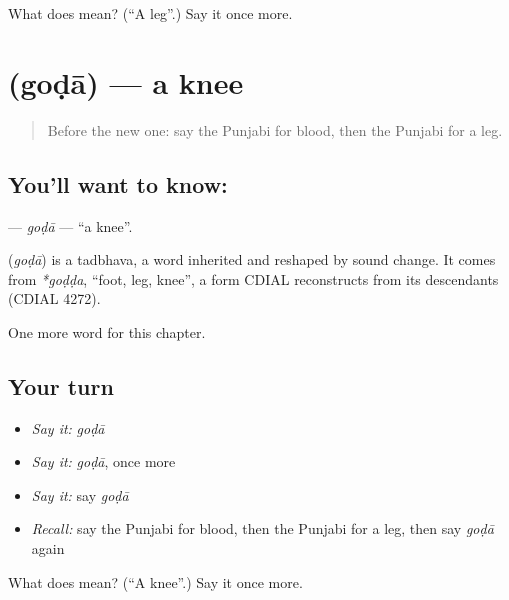 \begin{tcolorbox}[breakable,colback=teal!4,colframe=teal!35!black,title={Before you move on}]
What does  mean? (\textquotedblleft{}A leg\textquotedblright{}.) Say it once more.
\end{tcolorbox}
\section[\texorpdfstring{\pa{ਗੋਡਾ} (goḍā)}{ਗੋਡਾ (goḍā)}]{ (goḍā) — a knee}

\label{lesson:PA-C51-goda}



\begin{quote}
Before the new one: say the Punjabi for blood, then the Punjabi for a leg.
\end{quote}

\subsection*{You'll want to know: }
\textbf{} — \emph{goḍā} — \textquotedblleft{}a knee\textquotedblright{}.

\begin{cousinweb}
\textbf{} (\emph{goḍā}) is a tadbhava, a word inherited and reshaped by sound change. It comes from \emph{*goḍḍa}, \textquotedblleft{}foot, leg, knee\textquotedblright{}, a form CDIAL reconstructs from its descendants (CDIAL 4272).
\end{cousinweb}

\begin{grammarlens}[title={What you've built}]
One more word for this chapter.
\end{grammarlens}

\subsection*{Your turn}
\begin{itemize}
\raggedright
  \item \emph{Say it:} \emph{goḍā}
  \item \emph{Say it:} \emph{goḍā}, once more
  \item \emph{Say it:} say \emph{goḍā}
  \item \emph{Recall:} say the Punjabi for blood, then the Punjabi for a leg, then say \emph{goḍā} again
\end{itemize}

\begin{tcolorbox}[breakable,colback=teal!4,colframe=teal!35!black,title={Before you move on}]
What does  mean? (\textquotedblleft{}A knee\textquotedblright{}.) Say it once more.
\end{tcolorbox}
